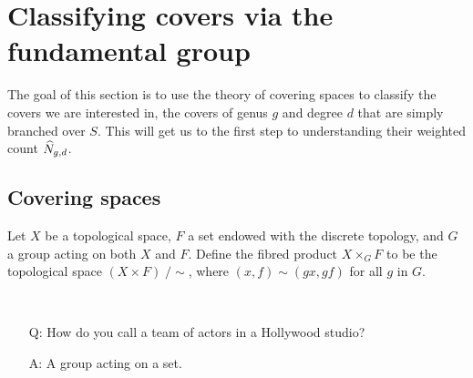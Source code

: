 \section{Classifying covers via the fundamental group}

The goal of this section is to use the theory of covering spaces to classify the covers we are interested in, \ie the covers of genus $g$ and degree $d$ that are simply branched over $S$. This will get us to the first step to understanding their weighted count $\widehat{N}_{g,d}$.

\subsection{Covering spaces} \label{sec:covering-spaces}

\begin{defi}
 Let $X$ be a topological space, $F$ a set endowed with the discrete topology, and $G$ a group acting on both $X$ and $F$. Define the fibred product $X \times_{G} F$ to be the topological space $(X\times F)\; /\sim$, where $(x,f)\sim (gx,gf)$ for all $g$ in $G$.
\end{defi}

\begin{joke} \ 
 \begin{enumerate}
 \item [Q: ] How do you call a team of actors in a Hollywood studio?
 \item [A: ] A group acting on a set.
 \end{enumerate}
\end{joke}
\fi

